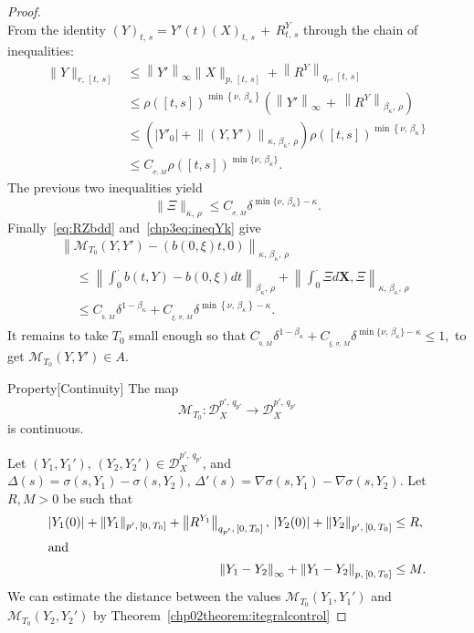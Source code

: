 \documentclass[10pt]{amsart}
\theoremstyle{definition}\newtheorem{defi}[theo]{Definition}\newtheorem{rema}[theo]{Remark}\newtheorem{exam}[theo]{Example}\newtheorem{exem}[theo]{Example}\newtheorem{nota}[theo]{Notation}
\newcommand{\scrD}{\mathscr{D}}
\newcommand{\calM}{\mathcal{M}}
\begin{document}
\begin{proof}
\[\]
From the identity $(Y)_{t,\,s} =Y'(t) (X)_{t,\,s}\,+\, R^Y_{t,\,s}$ through the chain of inequalities:
\begin{align*}
\|Y\|_{r,\,[t,\,s]}&\leq \left\|Y'\right\|_{\infty}\|X\|_{p,\,[t,\,s]}+\left\|R^{Y}\right\|_{q_{r},\,[t,\,s]}\\
&\leq \rho([t,s])^{\min\left\{\nu,\,\beta_{\kappa}\right\}}\left(\left\|Y'\right\|_{\infty}\, +\,\left\|R^{Y}\right\|_{\beta_{\kappa},\,\rho}\right)\\
&\leq \left(\left|Y'_0\right|+\left\|\left(Y,Y'\right)\right\|_{\kappa,\,\beta_{\kappa},\,\rho}\right)\rho([t,s])^{\min\left\{\nu,\,\beta_{\kappa}\right\}}\\
&\leq C_{_{\sigma,\,M}}\rho([t,s])^{\min\{\nu,\, \beta_{\kappa}\}}.
\end{align*}
The previous two inequalities yield
\begin{equation}\label{chp3eq:ineqYk}
\|\Xi\|_{\kappa,\,\rho}\leq C_{_{\sigma,\,M}}\delta^{\min\{\nu,\,\beta_{\kappa}\}-\kappa}.
\end{equation}
Finally~\eqref{eq:RZbdd} and~\eqref{chp3eq:ineqYk} give
\begin{multline}
\left\|\calM_{T_0} \left(Y,Y'\right)-(b(0, \xi)t, 0)\right\|_{\kappa,\,\beta_{\kappa},\,\rho}\\
\begin{aligned}
&\leq \left\|\int_0^{\cdot}b(t, Y)-b(0, \xi) dt\right\|_{\beta_{\kappa},\,\rho}+\left\|\int_0^{\cdot}\Xi d\bm{X}, \Xi\right\|_{\kappa,\,\beta_{\kappa},\,\rho}\\
&\leq C_{_{b,\,M}} \delta^{1-\beta_{\kappa}}+C_{_{\xi,\,\sigma,\,M}}\delta^{\min\left\{\nu,\,\beta_{\kappa}\right\}-\kappa}.
\end{aligned}
\end{multline}
It remains to take $T_0$ small enough so that $C_{_{b,\,M}} \delta^{1-\beta_{\kappa}}+C_{_{\xi,\, \sigma,\,M}}\delta^{\min\{\nu,\,\beta_{\kappa}\}-\kappa}\leq 1,$ to get $\calM_{T_0}(Y,Y')\in A$.

\begin{enonce}{Property}[Continuity]
The map
\[
\calM_{T_0}\colon \scrD^{p',\,q_{p'}}_{X }\to \scrD^{p',\,q_{p'}}_{X }
\]
is continuous.
\end{enonce}

Let $(Y_1,Y_1'),\, (Y_2,Y_2')\in \scrD^{p',\,q_{p'}}_{X }$, and $\Delta(s)=\sigma(s,Y_{1})-\sigma(s,Y_{2}),\, \Delta'(s)=\nabla\sigma(s,Y_{1})-\nabla\sigma(s,Y_{2})$. Let $R, M>0$ be such that
\begin{align*}
\left|Y_1(0)\right|+\|Y_1\|_{p',\,\left[0,\,T_0\right]} +\left\|R^{Y_1}\right\|_{q_{p'},\,\left[0,\,T_0\right]},\,\left|Y_2(0)\right|+\left\|Y_2\right\|_{p',\,\left[0,\,T_0\right]} &\leq R,
\\
\intertext{and}
\left\|Y_1-Y_2\right\|_{\infty}+\left\|Y_1-Y_2\right\|_{p,\,\left[0,\,T_0\right]} &\leq M.
\end{align*}
We can estimate the distance between the values $\calM_{T_0}(Y_1,Y_1')$ and $\calM_{T_0}(Y_2,Y_2')$ by Theorem~\ref{chp02theorem:itegralcontrol}


\end{proof}
\end{document}
